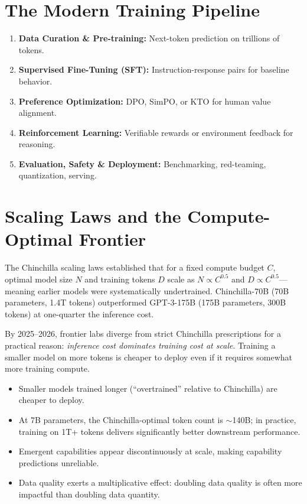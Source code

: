 \section{The Modern Training Pipeline}

\begin{enumerate}
  \item \textbf{Data Curation \& Pre-training:} Next-token prediction on trillions of tokens.
  \item \textbf{Supervised Fine-Tuning (SFT):} Instruction-response pairs for baseline behavior.
  \item \textbf{Preference Optimization:} DPO, SimPO, or KTO for human value alignment.
  \item \textbf{Reinforcement Learning:} Verifiable rewards or environment feedback for reasoning.
  \item \textbf{Evaluation, Safety \& Deployment:} Benchmarking, red-teaming, quantization, serving.
\end{enumerate}

\section{Scaling Laws and the Compute-Optimal Frontier}

The Chinchilla scaling laws \parencite{hoffmann2022training} established that for a fixed compute budget $C$, optimal model size $N$ and training tokens $D$ scale as $N \propto C^{0.5}$ and $D \propto C^{0.5}$---meaning earlier models were systematically undertrained. Chinchilla-70B (70B parameters, 1.4T tokens) \parencite{hoffmann2022training} outperformed GPT-3-175B (175B parameters, 300B tokens) \parencite{brown2020language} at one-quarter the inference cost.

By 2025--2026, frontier labs diverge from strict Chinchilla prescriptions for a practical reason: \emph{inference cost dominates training cost at scale}. Training a smaller model on more tokens is cheaper to deploy even if it requires somewhat more training compute.

\begin{keyinsight}
\begin{itemize}
  \item Smaller models trained longer (``overtrained'' relative to Chinchilla) are cheaper to deploy.
  \item At 7B parameters, the Chinchilla-optimal token count is $\sim$140B; in practice, training on 1T+ tokens delivers significantly better downstream performance.
  \item Emergent capabilities appear discontinuously at scale, making capability predictions unreliable.
  \item Data quality exerts a multiplicative effect: doubling data quality is often more impactful than doubling data quantity.
\end{itemize}
\end{keyinsight}

